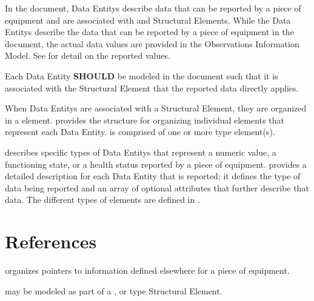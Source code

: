 In the  document, \glspl{Data Entity} describe data that can be reported by a piece of equipment and are associated with  and  \glspl{Structural Element}.   While the \glspl{Data Entity} describe the data that can be reported by a piece of equipment in the  document, the actual data values are provided in the \gls{Observations Information Model}.   See  for detail on the reported values.

Each \gls{Data Entity} \textbf{SHOULD} be modeled in the  document such that it is associated with the \gls{Structural Element} that the reported data directly applies.

When \glspl{Data Entity} are associated with a \gls{Structural Element}, they are organized in a  element.    provides the structure for organizing individual  elements that represent each \gls{Data Entity}.  is comprised of one or more  type element(s).

 describes specific types of \glspl{Data Entity} that represent a numeric value, a functioning state, or a health status reported by a piece of equipment.  provides a detailed description for each \gls{Data Entity} that is reported; it defines the type of data being reported and an array of optional attributes that further describe that data.   The different types of  elements are defined in .











\section{References}
\label{sec:References}

 organizes pointers to information defined elsewhere for a piece of equipment.

 may be modeled as part of a ,  or  type \gls{Structural Element}.

